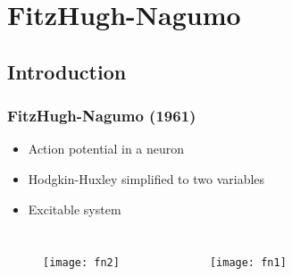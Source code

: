 \documentclass[11pt]{beamer}
\begin{document}
\begin{comment}
    \draw [-] (inverse) -- (output);
    \draw [->] (output) |- node[near start] {$u$}(linear_tf);
    \draw [-] (linear_tf) -| node[near end] {$y$} (input);
    \draw [->] (input) -- (inverse);

\end{tikzpicture}
\column{0.5\textwidth}
\begin{figure}
\texttt{[image: goodwin\_mathcing]}
\end{figure}
\end{columns}
\end{frame}

\end{comment}
\section{FitzHugh-Nagumo}

\subsection{Introduction}

\begin{frame}
\frametitle{FitzHugh-Nagumo (1961)}

\begin{itemize}
\item Action potential in a neuron
\item Hodgkin-Huxley simplified to two variables
\item Excitable system
\end{itemize}
\begin{columns}
\begin{figure}
\texttt{[image: fn2]}
\end{figure}
\begin{figure}
\texttt{[image: fn1]}
\end{figure}
\end{columns}
\end{frame}
\end{document}
